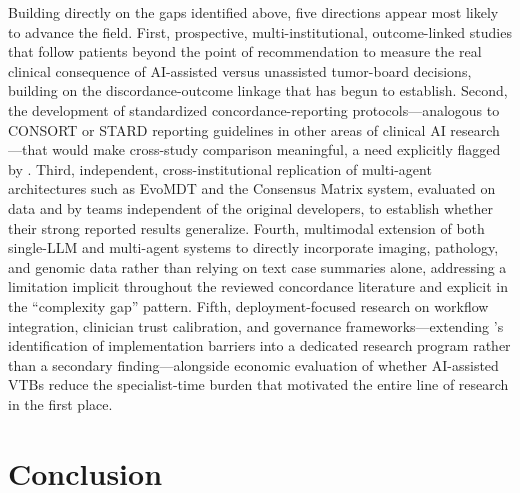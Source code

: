 \documentclass{article}
\begin{document}
Building directly on the gaps identified above, five directions appear most likely to advance the field. First, prospective, multi-institutional, outcome-linked studies that follow patients beyond the point of recommendation to measure the real clinical consequence of AI-assisted versus unassisted tumor-board decisions, building on the discordance-outcome linkage that \citet{aliyev2026} has begun to establish. Second, the development of standardized concordance-reporting protocols---analogous to CONSORT or STARD reporting guidelines in other areas of clinical AI research---that would make cross-study comparison meaningful, a need explicitly flagged by \citet{carl2024}. Third, independent, cross-institutional replication of multi-agent architectures such as EvoMDT and the Consensus Matrix system, evaluated on data and by teams independent of the original developers, to establish whether their strong reported results generalize. Fourth, multimodal extension of both single-LLM and multi-agent systems to directly incorporate imaging, pathology, and genomic data rather than relying on text case summaries alone, addressing a limitation implicit throughout the reviewed concordance literature and explicit in the ``complexity gap'' pattern. Fifth, deployment-focused research on workflow integration, clinician trust calibration, and governance frameworks---extending \citeauthor{wu2026}'s \citeyearpar{wu2026} identification of implementation barriers into a dedicated research program rather than a secondary finding---alongside economic evaluation of whether AI-assisted VTBs reduce the specialist-time burden that motivated the entire line of research in the first place.

\section{Conclusion}
\label{sec:conclusion}
\end{document}
